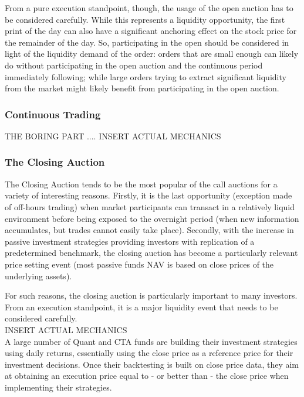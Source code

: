 From a pure execution standpoint, though, the usage of the open auction has to be considered carefully. While this represents a liquidity opportunity, the first print of the day can also have a significant anchoring effect on the stock price for the remainder of the day. So, participating in the open should be considered in light of the liquidity demand of the order: orders that are small enough can likely do without participating in the open auction and the continuous period immediately following; while large orders trying to extract significant liquidity from the market might likely benefit from participating in the open auction.


\subsubsection{Continuous Trading}

THE BORING PART .... INSERT ACTUAL MECHANICS \\


\subsubsection{The Closing Auction}

The Closing Auction tends to be the most popular of the call auctions for a variety of interesting reasons. Firstly, it is the last opportunity (exception made of off-hours trading) when market participants can transact in a relatively liquid environment before being exposed to the overnight period (when new information accumulates, but trades cannot easily take place). Secondly, with the increase in passive investment strategies providing investors with replication of a predetermined benchmark, the closing auction has become a particularly relevant price setting event (most passive funds NAV is based on close prices of the underlying assets). 

For such reasons, the closing auction is particularly important to many investors. From an execution standpoint, it is a major liquidity event that needs to be considered carefully. \\

INSERT ACTUAL MECHANICS \\

A large number of Quant and CTA funds are building their investment strategies using daily returns, essentially using the close price as a reference price for their investment decisions. Once their backtesting is built on close price data, they aim at obtaining an execution price equal to - or better than - the close price when implementing their strategies. 

